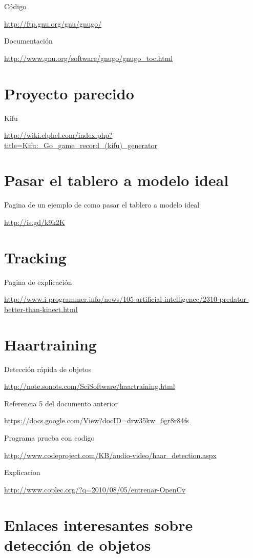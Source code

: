 \documentclass[12pt,a4paper]{report}
\begin{document}
Código

\url{http://ftp.gnu.org/gnu/gnugo/}

Documentación

\url{http://www.gnu.org/software/gnugo/gnugo_toc.html}

\section{Proyecto parecido}

Kifu

\url{http://wiki.elphel.com/index.php?title=Kifu:_Go_game_record_(kifu)_generator}

\section{Pasar el tablero a modelo ideal}

Pagina de un ejemplo de como pasar el tablero a modelo ideal

\url{http://is.gd/k9k2K}


\section{Tracking }

Pagina de explicación

\url{http://www.i-programmer.info/news/105-artificial-intelligence/2310-predator-better-than-kinect.html}

\section{Haartraining}

Detección rápida de objetos

\url{http://note.sonots.com/SciSoftware/haartraining.html}

Referencia 5 del documento anterior

\url{https://docs.google.com/View?docID=drw35kw_6gr8r84fs}

Programa prueba con codigo

\url{http://www.codeproject.com/KB/audio-video/haar_detection.aspx}

Explicacion

\url{http://www.coplec.org/?q=2010/08/05/entrenar-OpenCv}

\section{Enlaces interesantes sobre detección de objetos}
\end{document}
